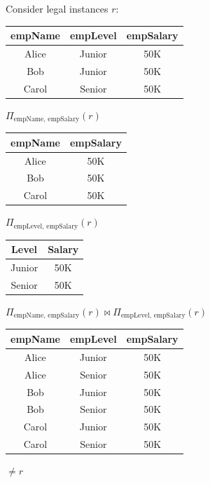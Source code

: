 \documentclass{article}
\begin{document}
Consider legal instances $r$:
\begin{tabular}{ccc}
\toprule
\textbf{empName} & \textbf{empLevel} & \textbf{empSalary} \\
\midrule
Alice & Junior & 50K \\
Bob   & Junior & 50K \\
Carol & Senior & 50K \\
\bottomrule
\end{tabular}

$\Pi_{\text{empName, empSalary}}(r)$
\begin{tabular}{cc}
\toprule
\textbf{empName} & \textbf{empSalary} \\
\midrule
Alice & 50K \\
Bob   & 50K \\
Carol & 50K \\
\bottomrule
\end{tabular}

$\Pi_{\text{empLevel, empSalary}}(r)$
\begin{tabular}{cc}
\toprule
\textbf{Level} & \textbf{Salary} \\
\midrule
Junior & 50K \\
Senior & 50K \\
\bottomrule
\end{tabular}

$\Pi_{\text{empName, empSalary}}(r) \Join \Pi_{\text{empLevel, empSalary}}(r)$

\begin{tabular}{ccc}
\toprule
\textbf{empName} & \textbf{empLevel} & \textbf{empSalary} \\
\midrule
Alice & Junior & 50K \\
Alice & Senior & 50K \\
Bob   & Junior & 50K \\
Bob   & Senior & 50K \\
Carol & Junior & 50K \\
Carol & Senior & 50K \\
\bottomrule
\end{tabular}
$\neq r$


\end{document}
